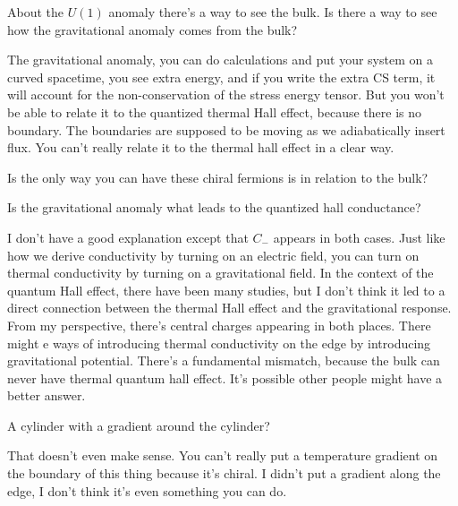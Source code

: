 \begin{question}
    About the $U(1)$ anomaly there's a way to see the bulk.
    Is there a way to see how the gravitational anomaly comes from the bulk?
\end{question}
The gravitational anomaly,
you can do calculations and put your system on a curved spacetime,
you see extra energy,
and if you write the extra CS term,
it will account for the non-conservation of the stress energy tensor.
But you won't be able to relate it to the quantized thermal Hall effect,
because there is no boundary.
The boundaries are supposed to be moving as we adiabatically insert flux.
You can't really relate it to the thermal hall effect in a clear way.

\begin{question}
    Is the only way you can have these chiral fermions is in relation to the
    bulk?
\end{question}

\begin{question}
    Is the gravitational anomaly what leads to the quantized hall conductance?
\end{question}
I don't have a good explanation except that $C_-$ appears in both cases.
Just like how we derive conductivity by turning on an electric field,
you can turn on thermal conductivity by turning on a gravitational field.
In the context of the quantum Hall effect,
there have been many studies,
but I don't think it led to a direct connection between the thermal Hall effect
and the gravitational response.
From my perspective,
there's central charges appearing in both places.
There might e ways of introducing thermal conductivity on the edge
by introducing gravitational potential.
There's a fundamental mismatch,
because the bulk can never have thermal quantum hall effect.
It's possible other people might have a better answer.

\begin{question}
    A cylinder with a gradient around the cylinder?
\end{question}
That doesn't even make sense.
You can't really put a temperature gradient on the boundary of this thing
because it's chiral.
I didn't put a gradient along the edge,
I don't think it's even something you can do.
